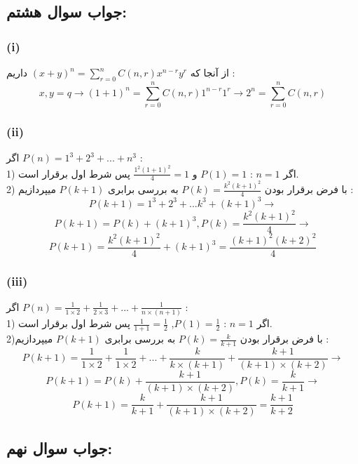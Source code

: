 \documentclass{article}
\begin{document}
		\subsection*{جواب سوال هشتم:}
			\subsubsection*{(i)}
				از آنجا که $(x + y)^n = \sum_{r = 0}^{n} C(n, r) x^{n-r} y^r$ داریم :\\
				\[
				x,y = q \rightarrow (1 + 1)^n = \sum_{r = 0}^{n} C(n, r) 1^{n-r} 1^r \rightarrow
				2^n = \sum_{r = 0}^{n} C(n, r)
				\]
			\subsubsection*{(ii)}
				اگر $P(n) = 1^3 + 2^3 + ... + n^3$ :\\
				1) اگر $n = 1$ : $P(1) = 1$ و $\frac{1^2 (1 + 1)^2}{4} = 1$ پس شرط اول برقرار است.\\
				2) با فرض برقرار بودن $P(k) = \frac{k^2 (k + 1)^2}{4}$ به بررسی برابری $P(k + 1)$ میپردازیم :\\
				\[P(k + 1) = 1^3 + 2^3 + ... k^3 + (k + 1)^3 \rightarrow\]
				\[P(k + 1) = P(k) + (k + 1)^3, P(k) = \frac{k^2 (k + 1)^2}{4} \rightarrow\]
				\[P(k + 1) = \frac{k^2 (k + 1)^2}{4} + (k + 1)^3 = \frac{(k + 1)^2 (k + 2)^2}{4}\]

			\subsubsection*{(iii)}
				اگر $P(n) = \frac{1}{1 \times 2} + \frac{1}{2 \times 3} + ... + \frac{1}{n \times (n + 1)}$ :\\
				1) اگر $n = 1$ : $P(1) = \frac{1}{2}$, $\frac{1}{1 + 1} = \frac{1}{2}$ پس شرط اول برقرار است.\\
				2)با فرض برقرار بودن $P(k) = \frac{k}{k + 1}$ به بررسی برابری $P(k + 1)$ میپردازیم :\\
				\[P(k + 1) = \frac{1}{1 \times 2} + \frac{1}{1 \times 2} + ... + \frac{k}{k \times (k + 1)} + \frac{k + 1}{(k + 1) \times (k + 2)} \rightarrow\]
				\[P(k + 1) = P(k) + \frac{k + 1}{(k + 1) \times (k + 2)}, P(k) = \frac{k}{k + 1} \rightarrow\]
				\[P(k + 1) = \frac{k}{k + 1} + \frac{k + 1}{(k + 1) \times (k + 2)} = \frac{k + 1}{k + 2}\]

		\subsection*{جواب سوال نهم:}
\end{document}
